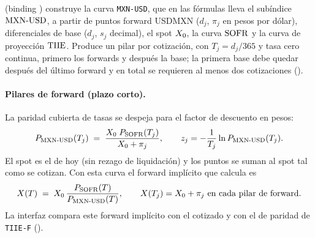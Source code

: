  (binding
) construye la curva \texttt{MXN-USD}, que en las fórmulas lleva el subíndice $\mathrm{MXN\text{-}USD}$, a partir
de puntos forward USDMXN 
($d_j$, $\pi_j$ en pesos por dólar), diferenciales de base
 ($d_j$, $s_j$ decimal), el spot $X_0$, la
curva $\mathrm{SOFR}$ y la curva de proyección $\mathrm{TIIE}$. Produce un pilar por cotización, con $T_j = d_j/365$ y tasa cero
continua, primero los forwards y después la base; la primera base debe quedar después del último forward y en total
se requieren al menos dos cotizaciones
().

\paragraph{Pilares de forward (plazo corto).} La paridad cubierta de tasas se despeja para el factor de descuento
en pesos:
\begin{equation}\label{eq:cap02-paridad}
  P_{\mathrm{MXN\text{-}USD}}(T_j) \;=\; \frac{X_0\;P_{\mathrm{SOFR}}(T_j)}{X_0 + \pi_j},
  \qquad z_j = -\frac{1}{T_j}\ln P_{\mathrm{MXN\text{-}USD}}(T_j).
\end{equation}
El spot es el de hoy (sin rezago de liquidación) y los puntos se suman al spot tal como se cotizan. Con esta curva el
forward implícito que calcula  es
\begin{equation}\label{eq:cap02-fwd-implicito}
  X(T) \;=\; X_0\,\frac{P_{\mathrm{SOFR}}(T)}{P_{\mathrm{MXN\text{-}USD}}(T)},
  \qquad X(T_j) = X_0 + \pi_j \ \text{en cada pilar de forward.}
\end{equation}
La interfaz compara este forward implícito con el cotizado y con el de paridad de \texttt{TIIE-F}
().

